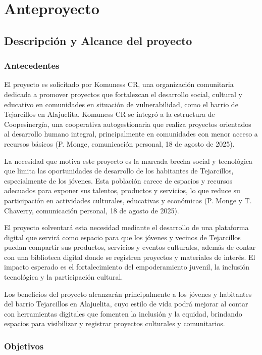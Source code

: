 \chapter{Anteproyecto}

\section{Descripción y Alcance del proyecto}
\subsection{Antecedentes}
El proyecto es solicitado por Komuness CR, una organización comunitaria dedicada a promover proyectos que fortalezcan el desarrollo social, cultural y educativo en comunidades en situación de vulnerabilidad, como el barrio de Tejarcillos en Alajuelita. Komuness CR se integró a la estructura de Coopesinergía, una cooperativa autogestionaria que realiza proyectos orientados al desarrollo humano integral, principalmente en comunidades con menor acceso a recursos básicos (P. Monge, comunicación personal, 18 de agosto de 2025).

La necesidad que motiva este proyecto es la marcada brecha social y tecnológica que limita las oportunidades de desarrollo de los habitantes de Tejarcillos, especialmente de los jóvenes. Esta población carece de espacios y recursos adecuados para exponer sus talentos, productos y servicios, lo que reduce su participación en actividades culturales, educativas y económicas (P. Monge y T. Chaverry, comunicación personal, 18 de agosto de 2025).

El proyecto solventará esta necesidad mediante el desarrollo de una plataforma digital que servirá como espacio para que los jóvenes y vecinos de Tejarcillos puedan compartir sus productos, servicios y eventos culturales, además de contar con una biblioteca digital donde se registren proyectos y materiales de interés. El impacto esperado es el fortalecimiento del empoderamiento juvenil, la inclusión tecnológica y la participación cultural.

Los beneficios del proyecto alcanzarán principalmente a los jóvenes y habitantes del barrio Tejarcillos en Alajuelita, cuyo estilo de vida podrá mejorar al contar con herramientas digitales que fomenten la inclusión y la equidad, brindando espacios para visibilizar y registrar proyectos culturales y comunitarios.

\subsection{Objetivos}

